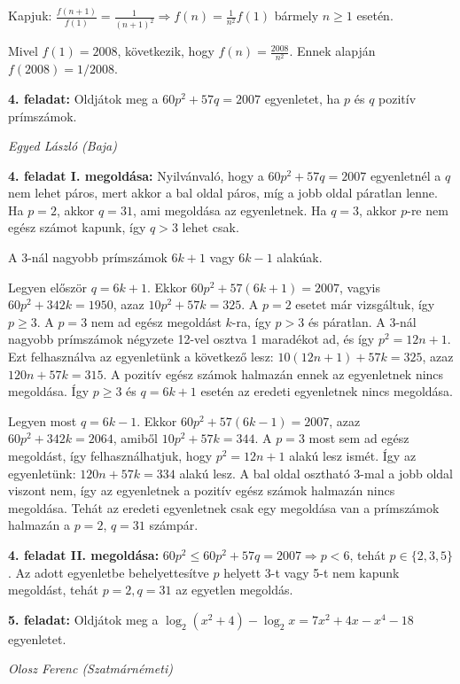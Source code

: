 \documentclass[a4paper,10pt]{article}
\def\ki#1#2{\hfill {\it #1 (#2)}\medskip}
\begin{document}
Kapjuk: $\frac{f(n+1)}{f(1)}=\frac{1}{(n+1)^2}\Rightarrow
f(n)=\frac{1}{n^2}f(1)$ bármely $n\ge 1$ esetén.

Mivel $f(1)=2008$, következik, hogy $f(n)=\frac{2008}{n^2}$.
Ennek alapján $f(2008)=1/2008$.


\medskip
{\bf 4. feladat: } Oldjátok meg a $60p^2+57q=2007$ egyenletet, ha $p$ és $q$ pozitív prímszámok.

\ki{Egyed László}{Baja}\medskip



{\bf 4. feladat I. megoldása: } Nyilvánvaló, hogy a $60p^2 + 57q = 2007$ egyenletnél a $q$ nem lehet páros,
mert akkor a bal oldal páros, míg a jobb oldal páratlan lenne.
Ha $p=2$, akkor $q=31$, ami megoldása az egyenletnek.
Ha $q=3$, akkor $p$-re nem egész számot kapunk, így $q>3$ lehet csak.

A 3-nál nagyobb prímszámok $6k+1$ vagy $6k-1$ alakúak. 

Legyen először
$q=6k+1$. Ekkor $60p^2 + 57(6k+1) =2007$, vagyis $60p^2 + 342k = 1950$, azaz $10p^2 +
57k = 325$. A $p=2$ esetet már vizsgáltuk, így $p \ge 3$. A $p=3$ nem ad egész megoldást $k$-ra, így $p>3$ és páratlan. A 3-nál nagyobb prímszámok négyzete 12-vel
osztva 1 maradékot ad, és így $p^2 = 12n+1$.
Ezt felhasználva az egyenletünk a következő lesz: $10(12n+1) + 57k =325$,
azaz $120n + 57k = 315$. A pozitív egész számok halmazán ennek az egyenletnek nincs megoldása.
Így $p \ge 3$ és $q=6k+1$ esetén az eredeti egyenletnek nincs megoldása.

Legyen most $q=6k-1$.
Ekkor $60p^2 +57(6k-1) =2007$, azaz $60p^2 +342k =2064$, amiből $10p^2 +57k
=344$. A $p=3$ most sem ad egész megoldást, így felhasználhatjuk, hogy $p^2=12n+1$
alakú lesz ismét. Így az egyenletünk: $120n +57k = 334$ alakú lesz. A bal oldal osztható 3-mal a jobb oldal viszont nem, így az egyenletnek a pozitív egész számok
halmazán nincs megoldása. Tehát az eredeti egyenletnek csak egy
megoldása van a prímszámok halmazán a $p=2$, $q=31$ számpár.



\medskip
{\bf 4. feladat II. megoldása: } $60p^2 \le 60p^2+57q=2007 \Rightarrow p<6$, 
tehát $p\in\{2,3,5\}$. Az adott egyenletbe behelyettesítve $p$ helyett 3-t vagy 5-t nem kapunk megoldást, tehát $p=2, q=31$ az egyetlen megoldás.



\medskip
{\bf 5. feladat: } Oldjátok meg a  
$\log_2\left(x^2+4\right)-\log_2 x=7x^2+4x-x^4-18$
egyenletet.

\ki{Olosz Ferenc}{Szatmárnémeti}\medskip
\end{document}
